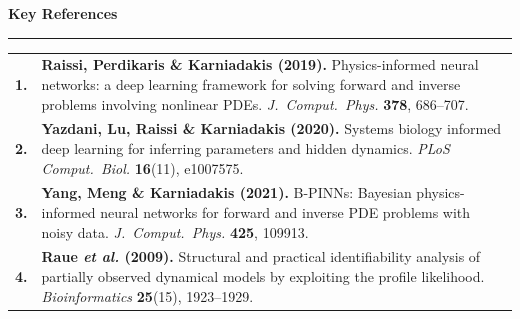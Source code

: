 \documentclass[aspectratio=169,11pt]{beamer}
\newcommand{\refnum}[1]{\textcolor{Cobalt}{\bfseries #1}}
\newcommand{\refwhy}[1]{{\itshape\color{Muted}#1}}
\begin{document}
\begin{frame}[plain]
  \centering
  \vspace{0.16cm}
  {\fontsize{15}{18}\selectfont\bfseries\color{Ink}Key References\par}
  \vspace{0.08cm}
  {\color{Cobalt}\rule{0.965\textwidth}{1.4pt}}
  \vspace{0.10cm}

  \begin{minipage}{0.965\textwidth}
    \raggedright
    \fontsize{9.6}{13.0}\selectfont
    \renewcommand{\arraystretch}{1.06}
    \begin{tabular}{@{}p{0.75cm}@{}p{\dimexpr\linewidth-0.75cm\relax}@{}}
      \refnum{1.} & \textbf{Raissi, Perdikaris \& Karniadakis (2019).}
        Physics-informed neural networks: a deep learning framework for solving
        forward and inverse problems involving nonlinear PDEs.
        \emph{J.\ Comput.\ Phys.} \textbf{378}, 686--707.\\[5.5pt]

      \refnum{2.} & \textbf{Yazdani, Lu, Raissi \& Karniadakis (2020).}
        Systems biology informed deep learning for inferring parameters and
        hidden dynamics. \emph{PLoS Comput.\ Biol.} \textbf{16}(11), e1007575.\\[5.5pt]

      \refnum{3.} & \textbf{Yang, Meng \& Karniadakis (2021).}
        B-PINNs: Bayesian physics-informed neural networks for forward and
        inverse PDE problems with noisy data.
        \emph{J.\ Comput.\ Phys.} \textbf{425}, 109913.\\[5.5pt]

      \refnum{4.} & \textbf{Raue \emph{et al.} (2009).}
        Structural and practical identifiability analysis of partially observed
        dynamical models by exploiting the profile likelihood.
        \emph{Bioinformatics} \textbf{25}(15), 1923--1929.\\[5.5pt]


\end{tabular}
\end{minipage}
\end{frame}
\end{document}
